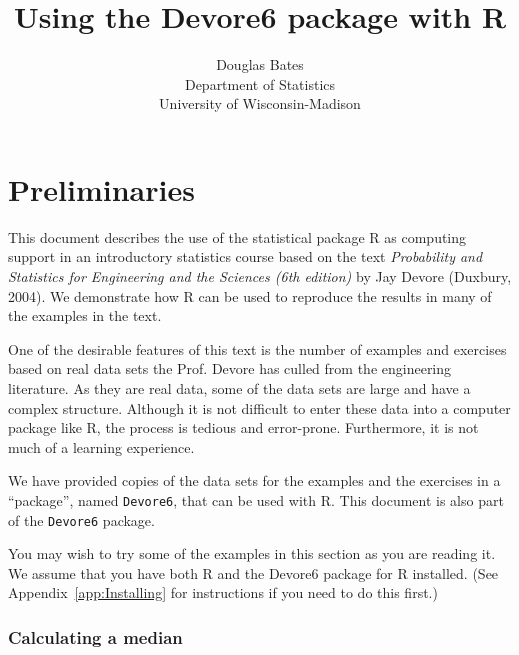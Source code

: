\documentclass{book}
\begin{document}
\title{Using the Devore6 package with R}
\author{Douglas Bates\\Department of Statistics\\
  University of Wisconsin-Madison}
\date{}
\maketitle

\tableofcontents

\setcounter{chapter}{-1}
\chapter{Preliminaries}

This document describes the use of the statistical package R as
computing support in an introductory statistics course based on the text
\emph{Probability and Statistics for Engineering and the Sciences (6th
edition)} by Jay Devore (Duxbury, 2004).  We demonstrate how R can be
used to reproduce the results in many of the examples in the text.

One of the desirable features of this text is the number of examples
and exercises based on real data sets the Prof.{} Devore has culled
from the engineering literature.  As they are real data, some of the
data sets are large and have a complex structure.  Although it is not
difficult to enter these data into a computer package like R, the
process is tedious and error-prone.  Furthermore, it is not much of a
learning experience.

We have provided copies of the data sets for the examples and the
exercises in a ``package'', named \texttt{Devore6}, that can be used
with R.  This document is also part of the \texttt{Devore6} package.

You may wish to try some of the examples in this section as you are
reading it.  We assume that you have both R and the Devore6
package for R installed.  (See Appendix~\ref{app:Installing} for
instructions if you need to do this first.)

\subsection*{Calculating a median}
\label{prelim:xmp0114}
\end{document}
